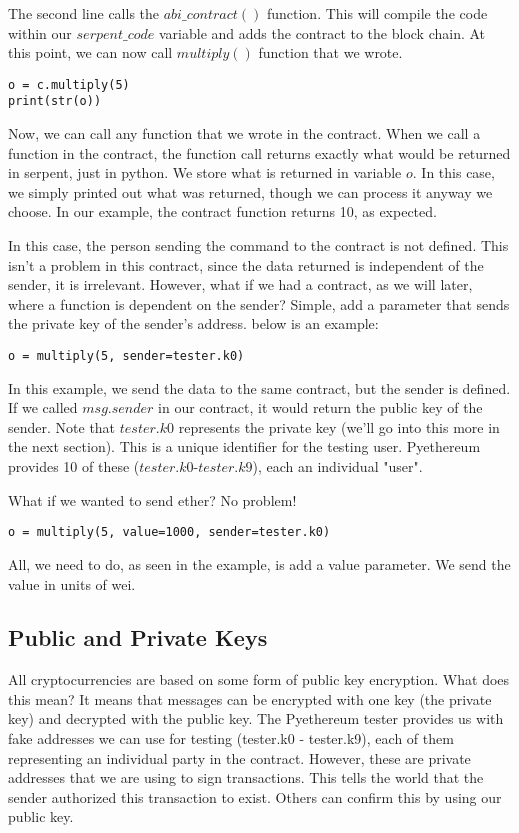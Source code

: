 \documentclass[12pt]{article}
\begin{document}
The second line calls the $abi\_contract()$ function. This will compile the code within our $serpent\_code$ variable and adds the contract to the block chain. At this point, we can now call $multiply()$ function that we wrote. 

\begin{verbatim}
o = c.multiply(5)
print(str(o))
\end{verbatim}

Now, we can call any function that we wrote in the contract. When we call a function in the contract, the function call returns exactly what would be returned in serpent, just in python. We store what is returned in variable $o$. In this case, we simply printed out what was returned, though we can process it anyway we choose. In our example, the contract function returns 10, as expected.

In this case, the person sending the command to the contract is not defined. This isn't a problem in this contract, since the data returned is independent of the sender, it is irrelevant. However, what if we had a contract, as we will later, where a function is dependent on the sender? Simple, add a parameter that sends the private key of the sender's address. below is an example:

\begin{verbatim}
o = multiply(5, sender=tester.k0)
\end{verbatim}

In this example, we send the data to the same contract, but the sender is defined. If we called $msg.sender$ in our contract, it would return the public key of the sender. Note that $tester.k0$ represents the private key (we'll go into this more in the next section). This is a unique identifier for the testing user. Pyethereum provides 10 of these ($tester.k0$-$tester.k9$), each an individual "user".

What if we wanted to send ether? No problem! 
\begin{verbatim}
o = multiply(5, value=1000, sender=tester.k0)
\end{verbatim}

All, we need to do, as seen in the example, is add a value parameter. We send the value in units of wei.

\cite{test_contracts.py,Usingpyethereum.tester}

\subsection{Public and Private Keys}
All cryptocurrencies are based on some form of public key encryption. What does this mean? It means that messages can be encrypted with one key (the private key) and decrypted with the public key. The Pyethereum tester provides us with fake addresses we can use for testing (tester.k0 - tester.k9), each of them representing an individual party in the contract. However, these are private addresses that we are using to sign transactions. This tells the world that the sender authorized this transaction to exist. Others can confirm this by using our public key. 
\end{document}
